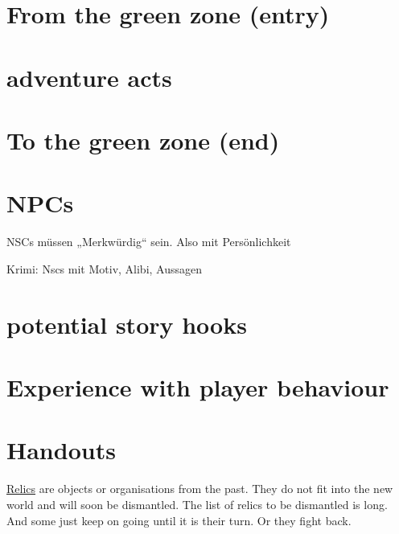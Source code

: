 \section{From the green zone (entry)}

\section{adventure acts}

\section{To the green zone (end)}

\section{NPCs}

NSCs müssen „Merkwürdig“ sein. Also mit Persönlichkeit

Krimi: Nscs mit Motiv, Alibi, Aussagen


\section{potential story hooks}

\section{Experience with player behaviour}

\section{Handouts}



\begin{sidebarBox}[title=Relics]
\hyperref[sec:Relic]{Relics} are objects or organisations from the past. They do not fit into the new world and will soon be dismantled. The list of relics to be dismantled is long. And some just keep on going until it is their turn. Or they fight back.
\end{sidebarBox}

